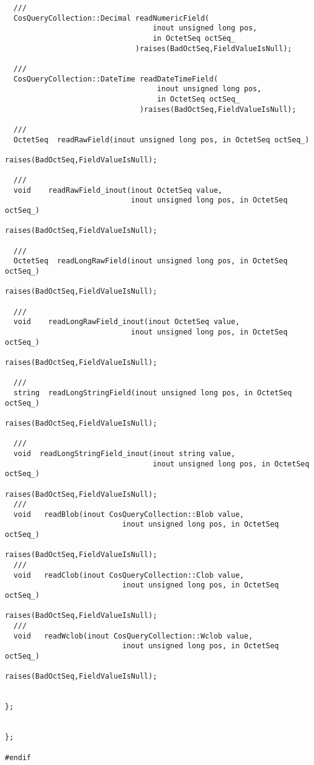 \documentclass[10pt]{article}
\begin{document}
\begin{verbatim}
  ///
  CosQueryCollection::Decimal readNumericField(
                                  inout unsigned long pos,
                                  in OctetSeq octSeq_
                              )raises(BadOctSeq,FieldValueIsNull);

  ///
  CosQueryCollection::DateTime readDateTimeField(
                                   inout unsigned long pos,
                                   in OctetSeq octSeq_
                               )raises(BadOctSeq,FieldValueIsNull);

  ///
  OctetSeq  readRawField(inout unsigned long pos, in OctetSeq octSeq_)
                                          raises(BadOctSeq,FieldValueIsNull);

  ///
  void    readRawField_inout(inout OctetSeq value, 
                             inout unsigned long pos, in OctetSeq octSeq_)
                                          raises(BadOctSeq,FieldValueIsNull);

  ///
  OctetSeq  readLongRawField(inout unsigned long pos, in OctetSeq octSeq_)
                                          raises(BadOctSeq,FieldValueIsNull);

  ///
  void    readLongRawField_inout(inout OctetSeq value, 
                             inout unsigned long pos, in OctetSeq octSeq_)
                                          raises(BadOctSeq,FieldValueIsNull);

  ///
  string  readLongStringField(inout unsigned long pos, in OctetSeq octSeq_)
                                          raises(BadOctSeq,FieldValueIsNull);

  ///
  void  readLongStringField_inout(inout string value,
                                  inout unsigned long pos, in OctetSeq octSeq_)
                                          raises(BadOctSeq,FieldValueIsNull);
  ///
  void   readBlob(inout CosQueryCollection::Blob value,
                           inout unsigned long pos, in OctetSeq octSeq_)
                                          raises(BadOctSeq,FieldValueIsNull);
  ///
  void   readClob(inout CosQueryCollection::Clob value,
                           inout unsigned long pos, in OctetSeq octSeq_)
                                          raises(BadOctSeq,FieldValueIsNull);
  ///
  void   readWclob(inout CosQueryCollection::Wclob value,
                           inout unsigned long pos, in OctetSeq octSeq_)
                                          raises(BadOctSeq,FieldValueIsNull);


};


};

#endif
\end{verbatim}
\end{document}
